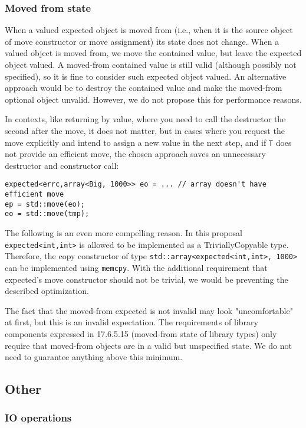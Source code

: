 \documentclass[a4paper,10pt]{article}
\newcommand{\cpp}[1]{\lstinline{#1}}
\begin{document}
\subsubsection{Moved from state}

When a valued expected object is moved from (i.e., when it is the source object of move constructor or move assignment) its state does not change. When a valued object is moved from, we move the contained value, but leave the expected object valued. A moved-from contained value is still valid (although possibly not specified), so it is fine to consider such expected object valued. An alternative approach would be to destroy the contained value and make the moved-from optional object unvalid. However, we do not propose this for performance reasons.

In contexts, like returning by value, where you need to call the destructor the second after the move, it does not matter, but in cases where you request the move explicitly and intend to assign a new value in the next step, and if \cpp{T} does not provide an efficient move, the chosen approach saves an unnecessary destructor and constructor call:

\begin{lstlisting}
expected<errc,array<Big, 1000>> eo = ... // array doesn't have efficient move
ep = std::move(eo);
eo = std::move(tmp);
\end{lstlisting}

The following is an even more compelling reason. In this proposal \cpp{expected<int,int>} is allowed to be implemented as a TriviallyCopyable type. Therefore, the copy constructor of type \cpp{std::array<expected<int,int>, 1000>} can be implemented using \cpp{memcpy}. With the additional requirement that expected's move constructor should not be trivial, we would be preventing the described optimization.

The fact that the moved-from expected is not invalid may look "uncomfortable" at first, but this is an invalid expectation. The requirements of library components expressed in 17.6.5.15 (moved-from state of library types) only require that moved-from objects are in a valid but unspecified state. We do not need to guarantee anything above this minimum.

\subsection{Other}

\subsubsection{IO operations}
\end{document}
